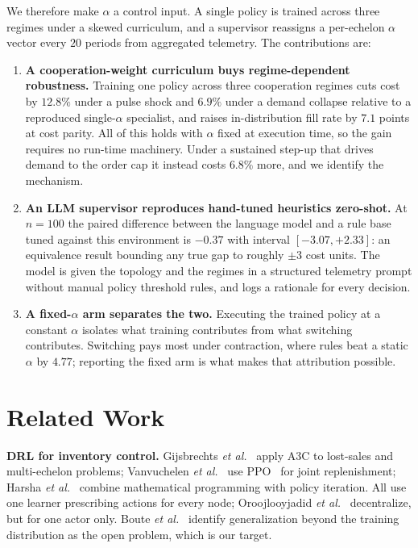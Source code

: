 \documentclass[conference]{IEEEtran}
\begin{document}
We therefore make $\alpha$ a control input. A single policy is trained
across three regimes under a skewed curriculum, and a supervisor reassigns a
per-echelon $\alpha$ vector every $20$ periods from aggregated telemetry.
The contributions are:

\begin{enumerate}
\item \textbf{A cooperation-weight curriculum buys regime-dependent
robustness.} Training one policy across three cooperation regimes cuts cost
by $12.8\%$ under a pulse shock and $6.9\%$ under a demand collapse relative
to a reproduced single-$\alpha$ specialist, and raises in-distribution fill
rate by $7.1$ points at cost parity. All of this holds with $\alpha$ fixed
at execution time, so the gain requires no run-time machinery. Under a
sustained step-up that drives demand to the order cap it instead costs
$6.8\%$ more, and we identify the mechanism.

\item \textbf{An LLM supervisor reproduces hand-tuned heuristics zero-shot.}
At $n=100$ the paired difference between the language model and a rule base
tuned against this environment is $-0.37$ with interval $[-3.07, +2.33]$:
an equivalence result bounding any true gap to roughly $\pm 3$ cost units.
The model is given the topology and the regimes in a structured telemetry prompt
without manual policy threshold rules, and logs a rationale for every decision.

\item \textbf{A fixed-$\alpha$ arm separates the two.} Executing the trained
policy at a constant $\alpha$ isolates what training contributes from what
switching contributes. Switching pays most under contraction, where rules
beat a static $\alpha$ by $4.77$; reporting the fixed arm is what makes that
attribution possible.
\end{enumerate}

\section{Related Work}

\textbf{DRL for inventory control.} Gijsbrechts
\emph{et al.}~\cite{gijsbrechts2021} apply A3C to lost-sales and
multi-echelon problems; Vanvuchelen \emph{et al.}~\cite{vanvuchelen2020}
use PPO~\cite{schulman2017} for joint replenishment; Harsha
\emph{et al.}~\cite{harsha2022} combine mathematical programming with
policy iteration. All use one learner prescribing actions for every
node; Oroojlooyjadid \emph{et al.}~\cite{oroojlooy2022} decentralize, but
for one actor only. Boute \emph{et al.}~\cite{boute2022} identify
generalization beyond the training distribution as the open problem, which
is our target.
\end{document}
